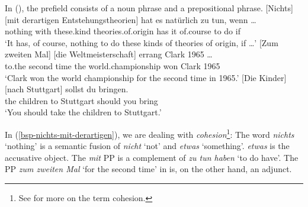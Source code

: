 In (), the prefield consists of a noun phrase and a prepositional phrase.
\eal 
\gll {}[Nichts] [mit derartigen Entstehungstheorien] hat es natürlich zu tun, wenn \ldots \label{bsp-nichts-mit-derartigen}\footnotemark\\
	 \spacebr{}nothing \spacebr{}with these.kind theories.of.origin has it of.course to do if\\      
\glt `It has, of course, nothing to do these kinds of theories of origin, if \ldots'
\ex 
\gll {}[Zum zweiten Mal] [die Weltmeisterschaft] errang Clark 1965 \ldots\footnotemark\\
	   \spacebr{}to.the second time \spacebr{}the world.championship won Clark 1965 {}\\
\label{bsp-zum-zweiten-mal-die-Weltmeisterschaft}
\glt `Clark won the world championship for the second time in 1965.'
\ex\label{die-kinder-nach-stuttgart}
\gll {}[Die Kinder] [nach Stuttgart] sollst du bringen.\footnotemark\\
     \spacebr{}the children \spacebr{}to Stuttgart should you bring\\
\glt `You should take the children to Stuttgart.'
\zl



\noindent
In (\ref{bsp-nichts-mit-derartigen}), we are dealing with \emph{cohesion}\footnote{%
			See  for more on the term cohesion.
}: The word \emph{nichts} `nothing' is a semantic fusion of  \emph{nicht} `not'
and \emph{etwas} `something'.  \emph {etwas} is the accusative object. The \emph{mit} PP is a
complement of \emph{zu tun haben} `to do have'.
The PP \emph{zum zweiten Mal} `for the second time' in  is, on the other hand,
an adjunct.


\begin{comment}
Reviewer: raus

\citet[\page 69]{Fanselow93a} diskutiert das folgende Beispiel:
\ea
In Hamburg eine Wohnung hätte er sich besser nicht suchen sollen.
\z
Bei diesem Beispiel handelt es sich aber wahrscheinlich im NP-interne Voranstellung, wie sie
\zb von \citet[\page 68]{Fortmann96a-unread-gekauft} für (\mex{1}) in Erwägung gezogen wird:
\ea
Mit der Bahn eine Reise ist nicht geplant.
\z
\citet[\page 133]{Abb94} analysiert solche Voranstellungen als DP-interne Topikalisierungen.
Er ordnet auch folgende Beispiele als umgangsprachlich möglich ein:
\eal
\ex Übermorgen das Spiel gegen Kaiserslautern würde ich gern live sehen.
\ex Der die Karten hat, der Mann, soll gleich kommen.
\ex An der Wand das Bild kommt mir bekannt vor.
\zl
Bei (\mex{0}b) sieht man besonders deutlich, daß es sich nicht um eine Mehrfachbesetzung
des Vorfelds handeln kann, da der Relativsatz ja allein nicht vorfeldfähig ist. Solche Beispiele
sollen in diesem Aufsatz nicht behandelt werden.
\end{comment}


